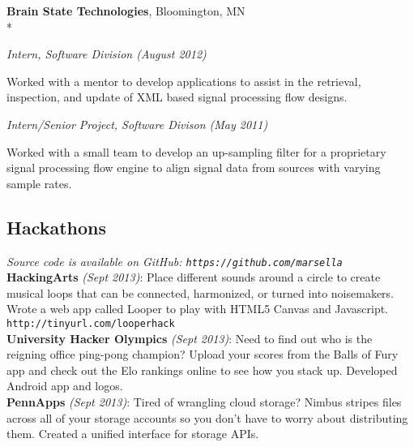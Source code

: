 \documentclass{article}
\newcommand{\position}[2]{
  \textit{#1 (#2)}
}
\newcommand{\affiliation}[2]{
  \textbf{#1}, #2 \\*
}
\newenvironment{achievements}{
  \begin{compactitem} }{
  \end{compactitem}
}
\newcommand{\hack}[3]{
  \textbf{#1} \textit{(#2)}: #3
  \smallskip
}
\begin{document}
  \affiliation{Brain State Technologies}  {Bloomington, MN}
    \position {Intern, Software Division} {August 2012}
    \begin{achievements}
      \item Worked with a mentor to develop applications to assist in the
            retrieval, inspection, and update of XML based signal processing 
            flow designs.
      \begin{comment}
      \item Defined XML schema to bind application configuration parameters to 
            Java objects (using Apache XMLBeans).
      \end{comment}
    \end{achievements}

    \position {Intern/Senior Project, Software Divison} {May 2011}
    \begin{achievements}
      \item Worked with a small team to develop an up-sampling filter for a
      proprietary signal processing flow engine to align signal data from
      sources with varying sample rates.
    \end{achievements}

\subsection*{Hackathons}
  \textit{Source code is available on GitHub:
  \texttt{https://github.com/marsella}} \\
  \hack{HackingArts} {Sept 2013} 
        {Place different sounds around a circle to create musical loops that
        can be connected, harmonized, or turned into noisemakers. Wrote a web
        app called Looper to play with HTML5 Canvas and
        Javascript. \texttt{http://tinyurl.com/looperhack}} \\
  \hack{University Hacker Olympics} {Sept 2013} 
        {Need to find out who is the reigning office ping-pong champion?
        Upload your scores from the Balls of Fury app and check out
        the Elo rankings online to see how you stack up. Developed Android app 
        and logos.} \\ 
  \hack{PennApps} {Sept 2013} 
        {Tired of wrangling cloud storage? Nimbus stripes files
        across all of your storage accounts so you don't have to worry about
        distributing them. Created a unified interface for storage APIs.}
\end{document}

